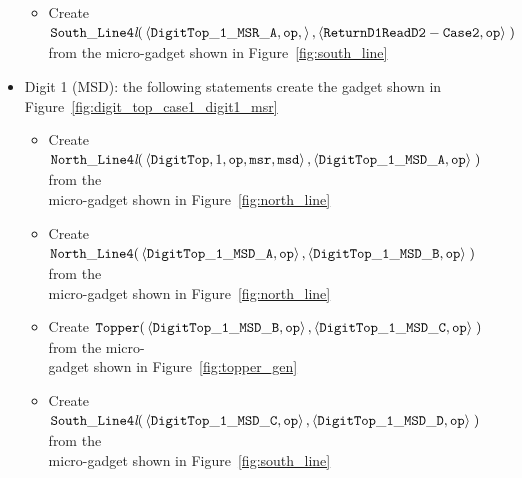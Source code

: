 \begin{itemize}
\begin{itemize}
            \item Create
            $\begin{aligned}[t]
                {\tt South\_Line4\textit{l}}(& \left\langle {\tt DigitTop\_1\_MSR\_A},  {\tt op}, \right\rangle,
                                               \left\langle {\tt ReturnD1ReadD2-Case2}, {\tt op}  \right\rangle \;)
            \end{aligned}$ \\ from the micro-gadget shown in Figure~\ref{fig:south_line}
        \end{itemize}
        \vspace{1cm}


        \item Digit 1 (MSD): the following statements create the gadget shown in Figure~\ref{fig:digit_top_case1_digit1_msr}
        \begin{itemize}
            \item Create
            $\begin{aligned}[t]
                {\tt North\_Line4\textit{l}}(& \left\langle {\tt DigitTop}, 1,          {\tt op}, {\tt msr}, {\tt msd} \right\rangle,
                                               \left\langle {\tt DigitTop\_1\_MSD\_A},  {\tt op}  \right\rangle \;)
            \end{aligned}$ from the\\micro-gadget shown in Figure~\ref{fig:north_line}

            \item Create $\begin{aligned}[t]
                {\tt North\_Line4}(& \left\langle {\tt DigitTop\_1\_MSD\_A},  {\tt op} \right\rangle,
                                     \left\langle {\tt DigitTop\_1\_MSD\_B},  {\tt op}  \right\rangle \;)
            \end{aligned}$ from the\\micro-gadget shown in Figure~\ref{fig:north_line}

            \item Create $\begin{aligned}[t]
                {\tt Topper}(& \left\langle {\tt DigitTop\_1\_MSD\_B},  {\tt op} \right\rangle,
                               \left\langle {\tt DigitTop\_1\_MSD\_C},  {\tt op}  \right\rangle \;)
            \end{aligned}$ from the micro-\\gadget shown in Figure~\ref{fig:topper_gen}

            \item Create
            $\begin{aligned}[t]
                {\tt South\_Line4\textit{l}}(& \left\langle {\tt DigitTop\_1\_MSD\_C}, {\tt op} \right\rangle,
                                               \left\langle {\tt DigitTop\_1\_MSD\_D}, {\tt op} \right\rangle \;)
            \end{aligned}$ from the\\ micro-gadget shown in Figure~\ref{fig:south_line}


\end{itemize}
\end{itemize}
